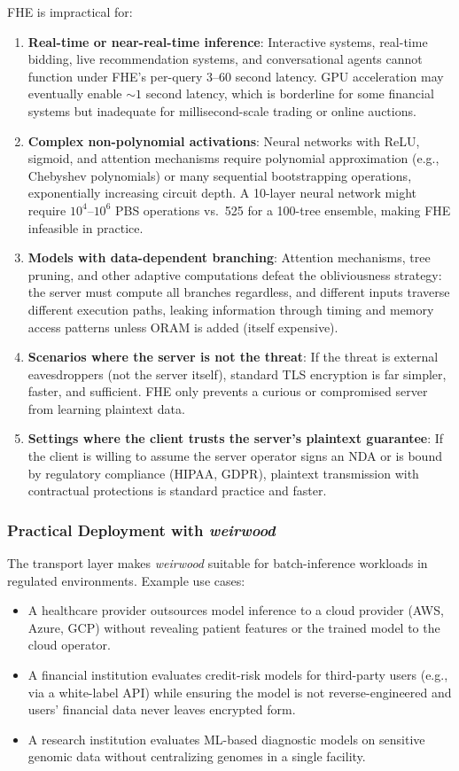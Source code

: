 \documentclass[12pt]{article}
\begin{document}
FHE is impractical for:
\begin{enumerate}
\item \textbf{Real-time or near-real-time inference}: Interactive systems, real-time bidding, live recommendation systems, and conversational agents cannot function under FHE's per-query 3--60 second latency. GPU acceleration may eventually enable $\sim 1$ second latency, which is borderline for some financial systems but inadequate for millisecond-scale trading or online auctions.
\item \textbf{Complex non-polynomial activations}: Neural networks with ReLU, sigmoid, and attention mechanisms require polynomial approximation (e.g., Chebyshev polynomials) or many sequential bootstrapping operations, exponentially increasing circuit depth. A 10-layer neural network might require $10^4$--$10^6$ PBS operations vs.~525 for a 100-tree ensemble, making FHE infeasible in practice.
\item \textbf{Models with data-dependent branching}: Attention mechanisms, tree pruning, and other adaptive computations defeat the obliviousness strategy: the server must compute all branches regardless, and different inputs traverse different execution paths, leaking information through timing and memory access patterns unless ORAM is added (itself expensive).
\item \textbf{Scenarios where the server is not the threat}: If the threat is external eavesdroppers (not the server itself), standard TLS encryption is far simpler, faster, and sufficient. FHE only prevents a curious or compromised server from learning plaintext data.
\item \textbf{Settings where the client trusts the server's plaintext guarantee}: If the client is willing to assume the server operator signs an NDA or is bound by regulatory compliance (HIPAA, GDPR), plaintext transmission with contractual protections is standard practice and faster.
\end{enumerate}

\subsubsection*{Practical Deployment with \textit{weirwood}}

The transport layer makes \textit{weirwood} suitable for batch-inference workloads in regulated environments. Example use cases:
\begin{itemize}
\item A healthcare provider outsources model inference to a cloud provider (AWS, Azure, GCP) without revealing patient features or the trained model to the cloud operator.
\item A financial institution evaluates credit-risk models for third-party users (e.g., via a white-label API) while ensuring the model is not reverse-engineered and users' financial data never leaves encrypted form.
\item A research institution evaluates ML-based diagnostic models on sensitive genomic data without centralizing genomes in a single facility.
\end{itemize}
\end{document}
